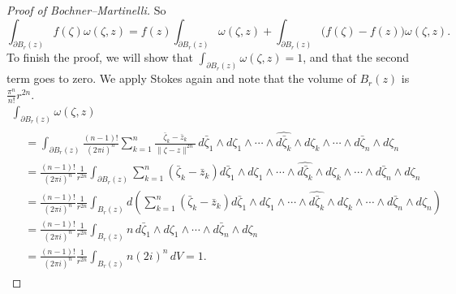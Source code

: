 \documentclass[12pt,openany]{book}
\newcommand{\snorm}[1]{\lVert {#1} \rVert}
\theoremstyle{plain}
\theoremstyle{remark}
\theoremstyle{definition}
\theoremstyle{exercise}
\theoremstyle{example}
\begin{document}
\begin{proof}[Proof of Bochner--Martinelli]
So
\begin{equation*}
\int_{\partial B_r(z)}
f(\zeta) \omega(\zeta,z)
=
f(z)
\int_{\partial B_r(z)}
\omega(\zeta,z)
+
\int_{\partial B_r(z)}
\bigl(f(\zeta)-f(z)\bigr) \omega(\zeta,z) .
\end{equation*}
To finish the proof,
we will show that
$\int_{\partial B_r(z)}
\omega(\zeta,z) = 1$, and that the second term goes to zero.
We apply Stokes again
and note that the volume of $B_r(z)$ is
$\frac{\pi^n}{n!}r^{2n}$.
\begin{multline*}
\int_{\partial B_r(z)}
\omega(\zeta,z)
\\
\begin{aligned}
&=
\int_{\partial B_r(z)}
\frac{(n-1)!}{{(2\pi i)}^n}
\sum_{k=1}^n
\frac{\bar{\zeta}_k-\bar{z}_k}{\snorm{\zeta-z}^{2n}} \,
d\bar{\zeta}_1 \wedge d\zeta_1 \wedge
\cdots \wedge
\widehat{ d\bar{\zeta}_k } \wedge d\zeta_k \wedge
\cdots \wedge
d\bar{\zeta}_n \wedge d\zeta_n
\\
&=
\frac{(n-1)!}{{(2\pi i)}^n}\frac{1}{r^{2n}}
\int_{\partial B_r(z)}
\sum_{k=1}^n(\bar{\zeta}_k-\bar{z}_k)
d\bar{\zeta}_1 \wedge d\zeta_1 \wedge
\cdots \wedge
\widehat{ d\bar{\zeta}_k } \wedge d\zeta_k \wedge
\cdots \wedge
d\bar{\zeta}_n \wedge d\zeta_n
\\
&=
\frac{(n-1)!}{{(2\pi i)}^n}\frac{1}{r^{2n}}
\int_{B_r(z)}
\!
d\left(
\sum_{k=1}^n(\bar{\zeta}_k-\bar{z}_k)
d\bar{\zeta}_1 \wedge d\zeta_1 \wedge
\cdots \wedge
\widehat{ d\bar{\zeta}_k } \wedge d\zeta_k \wedge
\cdots \wedge
d\bar{\zeta}_n \wedge d\zeta_n
\right)
\\
&=
\frac{(n-1)!}{{(2\pi i)}^n}\frac{1}{r^{2n}}
\int_{B_r(z)}
n
\, d\bar{\zeta}_1 \wedge d\zeta_1 \wedge
\cdots \wedge
d\bar{\zeta}_n \wedge d\zeta_n
\\
&=
\frac{(n-1)!}{{(2\pi i)}^n}\frac{1}{r^{2n}}
\int_{B_r(z)}
n
{(2i)}^n \, dV
=
1 .
\end{aligned}
\end{multline*}


\end{proof}
\end{document}
